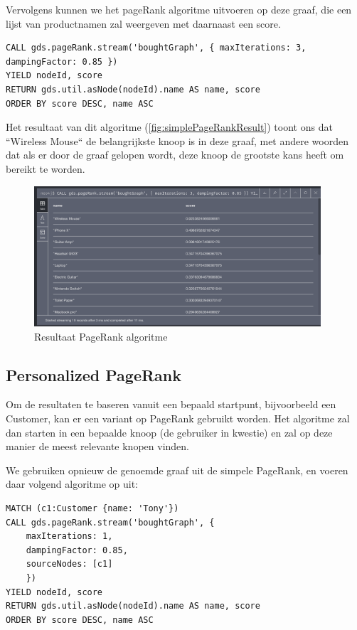 Vervolgens kunnen we het pageRank algoritme uitvoeren op deze graaf, die een lijst van productnamen zal weergeven met daarnaast een score.

\begin{lstlisting}[caption={PageRank algoritme uitvoeren}]
CALL gds.pageRank.stream('boughtGraph', { maxIterations: 3, dampingFactor: 0.85 })
YIELD nodeId, score
RETURN gds.util.asNode(nodeId).name AS name, score
ORDER BY score DESC, name ASC
\end{lstlisting}

Het resultaat van dit algoritme (\autoref{fig:simplePageRankResult}) toont ons dat ``Wireless Mouse`` de belangrijkste knoop is in deze graaf, met andere woorden dat als er door de graaf gelopen wordt, deze knoop de grootste kans heeft om bereikt te worden. 

\begin{figure} [ht]
	\centering
	\includegraphics[width=0.95\textwidth]{img/pageRank_res_1}
	\caption{Resultaat PageRank algoritme}
	\label{fig:simplePageRankResult}
\end{figure}


\subsection{Personalized PageRank}
\label{sec:Personalized PageRank}

Om de resultaten te baseren vanuit een bepaald startpunt, bijvoorbeeld een Customer, kan er een variant op PageRank gebruikt worden. Het algoritme zal dan starten in een bepaalde knoop (de gebruiker in kwestie) en zal op deze manier de meest relevante knopen vinden.

We gebruiken opnieuw de genoemde graaf uit de simpele PageRank, en voeren daar volgend algoritme op uit: 

\begin{lstlisting}[caption={Personalized PageRank algoritme }]
MATCH (c1:Customer {name: 'Tony'})
CALL gds.pageRank.stream('boughtGraph', {
	maxIterations: 1,
	dampingFactor: 0.85,
	sourceNodes: [c1]
	})
YIELD nodeId, score
RETURN gds.util.asNode(nodeId).name AS name, score
ORDER BY score DESC, name ASC
\end{lstlisting}

